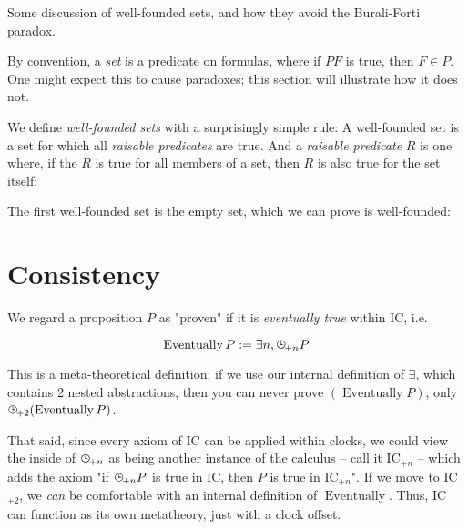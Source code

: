 \documentclass{article}
\begin{document}
  Some discussion of well-founded sets, and how they avoid the Burali-Forti paradox.
  
  By convention, a \emph{set} is a predicate on formulas, where if $PF$ is true, then $F \in P$. One might expect this to cause paradoxes; this section will illustrate how it does not.
  
  We define \emph{well-founded sets} with a surprisingly simple rule: A well-founded set is a set for which all \emph{raisable predicates} are true. And a \emph{raisable predicate} $R$ is one where, if the $R$ is true for all members of a set, then $R$ is also true for the set itself:

  
  The first well-founded set is the empty set, which we can prove is well-founded:
  
%
%
%
%

  \section{Consistency}\label{consistency}
  
  We regard a proposition $P$ as "proven" if it is \emph{eventually true} within IC, i.e.
  
  \newcommand{\eventually}{\operatorname{\mathrm{Eventually}}}
  
  \[ \eventually P := \exists n, \clocksub{+n} P \]
  
  This is a meta-theoretical definition; if we use our internal definition of $\exists$, which contains 2 nested abstractions, then you can never prove $(\eventually P)$, only $\clocksub{+2}(\eventually P)$.
  
  That said, since every axiom of IC can be applied within clocks, we could view the inside of $\clocksub{+n}$ as being another instance of the calculus – call it IC$_{+n}$ – which adds the axiom "if $\clocksub{+n} P$ is true in IC, then $P$ is true in IC$_{+n}$". If we move to IC$_{+2}$, we \emph{can} be comfortable with an internal definition of $\eventually$. Thus, IC can function as its own metatheory, just with a clock offset.
  
\end{document}
